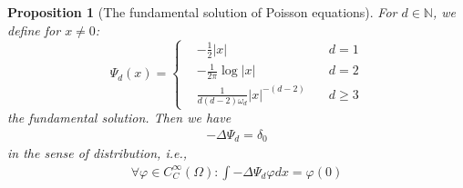 \documentclass[a4paper,11pt,oneside,fleqn]{book}
\newtheorem{proposition}[theorem]{Proposition}
\theoremstyle{definition}
\theoremstyle{remark}
\begin{document}
\begin{proposition}[The fundamental solution of Poisson equations]
 	For $d \in \mathbb{N}$, we define for $x \neq 0$: 
\begin{equation}\label{PE: fundamental solution}
	\Psi_d(x) = \left\{
	\begin{aligned}
		&-\frac{1}{2}|x| \quad &d = 1\\
		&-\frac{1}{2\pi} \log|x| \quad &d = 2\\
		& \frac{1}{d(d-2)\omega_d} |x|^{-(d-2)} \quad &d \geq3
	\end{aligned}
	\right.
\end{equation}
the fundamental solution. Then we have
\begin{align*}
	-\Delta \Psi_d = \delta_0 
\end{align*}
in the sense of distribution, i.e.,  
	\begin{align*}
		\forall \varphi \in C_C^\infty(\Omega): \int -\Delta \Psi_d \varphi dx = \varphi(0)
	\end{align*}
\end{proposition}
\end{document}
